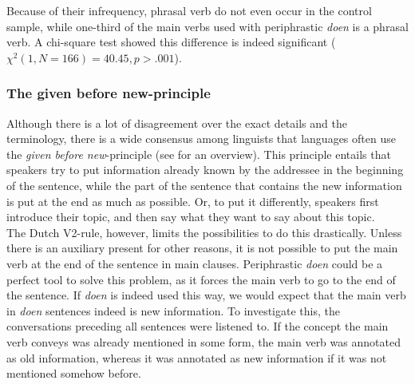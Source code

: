 \documentclass[12pt]{article}
\begin{document}
\begin{table}[h] \footnotesize

\caption{\footnotesize Distribution phrasal verbs versus non-phrasal verbs for the \emph{doen} sentences and the control sentences.}
\end{table}

Because of their infrequency, phrasal verb do not even occur in the control sample, while one-third of the main verbs used with periphrastic \emph{doen} is a phrasal verb. A chi-square test showed this difference is indeed significant ($\chi^2(1, N=166) = 40.45, p > .001$).

\subsubsection{The given before new-principle}

Although there is a lot of disagreement over the exact details and the terminology, there is a wide consensus among linguists that languages often use the \emph{given before new}-principle (see \citet{dsdh95} for an overview). This principle entails that speakers try to put information already known by the addressee in the beginning of the sentence, while the part of the sentence that contains the new information is put at the end as much as possible. Or, to put it differently, speakers first introduce their topic, and then say what they want to say about this topic.\\\indent
The Dutch V2-rule, however, limits the possibilities to do this drastically. Unless there is an auxiliary present for other reasons, it is not possible to put the main verb at the end of the sentence in main clauses. Periphrastic \emph{doen} could be a perfect tool to solve this problem, as it forces the main verb to go to the end of the sentence. If \emph{doen} is indeed used this way, we would expect that the main verb in \emph{doen} sentences indeed is new information. To investigate this, the conversations preceding all sentences were listened to. If the concept the main verb conveys was already mentioned in some form, the main verb was annotated as old information, whereas it was annotated as new information if it was not mentioned somehow before.
\end{document}
